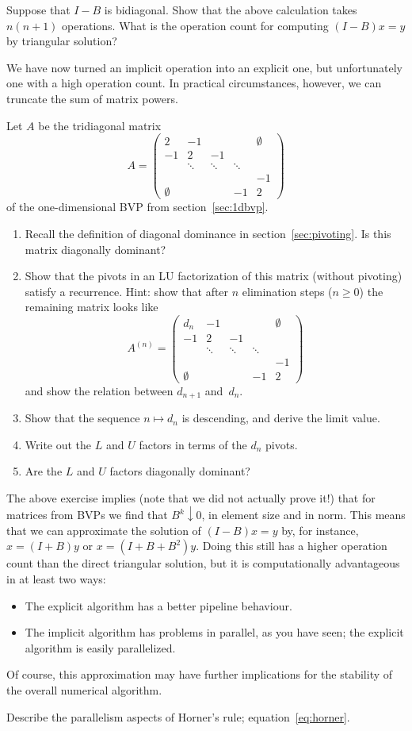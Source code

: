 \begin{exercise}
  Suppose that $I-B$ is bidiagonal.  Show that the above calculation
  takes $n(n+1)$ operations. What is the operation count for computing
  $(I-B)x=y$ by triangular solution?
\end{exercise}

We have now turned an implicit operation into an explicit one, but
unfortunately one with a high operation count. In practical
circumstances, however, we can truncate the sum of matrix powers.

\begin{exercise}
  Let $A$ be the tridiagonal matrix
\[ A=
\begin{pmatrix}
  2&-1&&&\emptyset\\ -1&2&-1\\ &\ddots&\ddots&\ddots\\
  &&&&-1\\ \emptyset&&&-1&2
\end{pmatrix}
\]
of the one-dimensional \ac{BVP} from section~\ref{sec:1dbvp}.
\begin{enumerate}
\item Recall the definition of diagonal dominance in
  section~\ref{sec:pivoting}. Is this matrix diagonally dominant?
\item Show that the pivots in an LU factorization of this matrix
  (without pivoting) satisfy a recurrence.  Hint: show that after $n$
  elimination steps ($n\geq0$) the remaining matrix looks like
\[ A^{(n)}=
\begin{pmatrix}
  d_n&-1&&&\emptyset\\ -1&2&-1\\ &\ddots&\ddots&\ddots\\
  &&&&-1\\ \emptyset&&&-1&2
\end{pmatrix}
\]
  and show the relation between $d_{n+1}$ and~$d_n$.
\item Show that the sequence $n\mapsto d_n$ is descending, and derive
  the limit value.
\item Write out the $L$ and $U$ factors in terms of the $d_n$ pivots.
\item Are the $L$ and $U$ factors diagonally dominant?
\end{enumerate}
\end{exercise}


The above exercise implies (note that we did not actually prove it!)
that for matrices from \acp{BVP} we find that $B^k\downarrow0$, in
element size and in norm. This means that we can approximate the solution
of $(I-B)x=y$ by, for instance, $x=(I+B)y$ or $x=(I+B+B^2)y$. 
%
Doing this still has a higher operation count than the direct
triangular solution, but it is computationally advantageous in at
least two ways:
\begin{itemize}
\item The explicit algorithm has a better pipeline behaviour.
\item The implicit algorithm has problems in parallel, as you have
  seen; the explicit algorithm is easily parallelized.
\end{itemize}
Of course, this
approximation may have further implications for the stability of the
overall numerical algorithm.

\begin{exercise}
  Describe the parallelism aspects of Horner's rule;
  equation~\eqref{eq:horner}.
\end{exercise}

